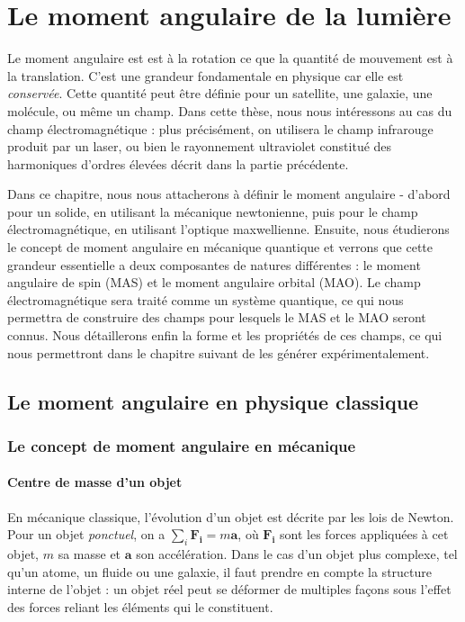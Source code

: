 \chapter{Le moment angulaire de la lumière}
\label{CH:OAM}

Le moment angulaire est est à la rotation ce que la quantité de mouvement est à la translation. C'est une grandeur fondamentale en physique car elle est \textit{conservée}. Cette quantité peut être définie pour un satellite, une galaxie, une molécule, ou même un champ. Dans cette thèse, nous nous intéressons au cas du champ électromagnétique : plus précisément, on utilisera le champ infrarouge produit par un laser, ou bien le rayonnement ultraviolet constitué des harmoniques d'ordres élevées décrit dans la partie précédente.\par
Dans ce chapitre, nous nous attacherons à définir le moment angulaire - d'abord pour un solide, en utilisant la mécanique newtonienne, puis pour le champ électromagnétique, en utilisant l'optique maxwellienne. Ensuite, nous étudierons le concept de moment angulaire en mécanique quantique et verrons que cette grandeur essentielle a deux composantes de natures différentes : le moment angulaire de spin (MAS) et le moment angulaire orbital (MAO). Le champ électromagnétique sera traité comme un système quantique, ce qui nous permettra de construire des champs pour lesquels le MAS et le MAO seront connus. Nous détaillerons enfin la forme et les propriétés de ces champs, ce qui nous permettront dans le chapitre suivant de les générer expérimentalement.

\section{Le moment angulaire en physique classique}
\subsection{Le concept de moment angulaire en mécanique}
\subsubsection{Centre de masse d'un objet}

En mécanique classique, l'évolution d'un objet est décrite par les lois de Newton. Pour un objet \textit{ponctuel}, on a $\sum_i{\bm{F_i}}=m\bm{a}$, où $\bm{F_i}$ sont les forces appliquées à cet objet, $m$ sa masse et $\bm{a}$ son accélération. Dans le cas d'un objet plus complexe, tel qu'un atome, un fluide ou une galaxie, il faut prendre en compte la structure interne de l'objet : un objet réel peut se déformer de multiples façons sous l'effet des forces reliant les éléments qui le constituent.

